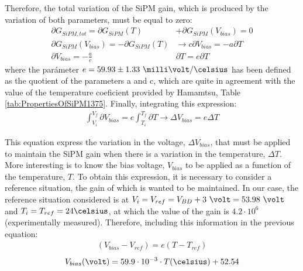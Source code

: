 Therefore, the total variation of the SiPM gain, which is produced by the variation of both parameters, must be equal to zero:
\begin{equation*}
\begin{split}
\partial G_{SiPM, tot}= \partial G_{SiPM}(T) &+ \partial G_{SiPM}(V_{bias}) = 0\\ 
\partial G_{SiPM}(V_{bias}) = -\partial G_{SiPM}(T) &\longrightarrow c \partial V_{bias} = - a \partial T\\ 
\partial V_{bias}  = - \frac{a}{c}&\partial T = e \partial T
\label{Gain_compensation0}
\end{split}
\end{equation*} 
where the parámeter $e= 59.93 \pm 1.33~\milli\volt/\celsius $ has been defined as the quotient of the parameters a and c, which are quite in agreement with the value of the temperature coeficient provided by Hamamtsu, Table \ref{tab:PropertiesOfSiPM1375}. Finally, integrating this expression:
\begin{equation}
\begin{split}
\int_{V_i}^{V_f}\partial V_{bias}  = e\int_{T_i}^{T_f}\partial T \longrightarrow \Delta V_{bias} = e \Delta T
\label{Gain_compensationIntegring}
\end{split}
\end{equation} 

This equation express the variation in the voltage, $\Delta V_{bias}$, that must be applied to maintain the SiPM gain when there is a variation in the temperature, $\Delta T$. More interesting is to know the bias voltage, $V_{bias}$ to be applied as a function of the temperature, $T$. To obtain this expression, it is necessary to consider a reference situation, the gain of which is wanted to be maintained. In our case, the reference situation considered is at $V_i=V_{ref}= V_{BD}+3~\volt = 53.98~\volt$ and $T_i=T_{ref}=24\celsius$, at which the value of the gain is $4.2 \cdot{} 10^{6}$ (experimentally measured). Therefore, including this information in the previous equation:
\begin{equation*}
\begin{split}
(V_{bias}-V_{ref} )= e \left( T -T_{ref} \right) 
\label{Gain_compensationEquation}
\end{split}
\end{equation*}
\begin{equation}
V_{bias}(\volt)= 59.9 \cdot{} 10^{-3} \cdot{} T(\celsius) + 52.54
\label{Gain_compensationReference}
\end{equation}  

